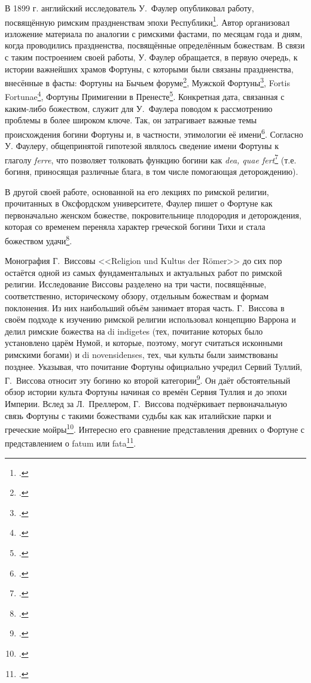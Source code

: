 
В 1899 г. английский исследователь У.~Фаулер опубликовал работу, посвящённую римским праздненствам эпохи Республики\footcite{Fowler1899}. Автор организовал изложение материала по аналогии с римскими фастами, по месяцам года и дням, когда проводились праздненства, посвящённые определённым божествам. В связи с таким построением своей работы, У. Фаулер обращается, в первую очередь, к истории важнейших храмов Фортуны, с которыми были связаны праздненства, внесённые в фасты: Фортуны на Бычьем форуме\footcite[P. 156--157]{Fowler1899}, Мужской Фортуны\footcite[P. 68]{Fowler1899}, Fortis Fortunae\footcite[P. 161--163]{Fowler1899}, Фортуны Примигении в Пренесте\footcite[P. 72, 165--168]{Fowler1899}. Конкретная дата, связанная с каким-либо божеством, служит для У.~Фаулера поводом к рассмотрению проблемы в более широком ключе. Так, он затрагивает важные темы происхождения богини Фортуны и, в частности, этимологии её имени\footcite[P. 163--171]{Fowler1899}. Согласно У. Фаулеру, общепринятой гипотезой являлось сведение имени Фортуны к глаголу \textit{ferre}, что позволяет толковать функцию богини как \textit{dea, quae fert}\footcite[P. 163--164]{Fowler1899} (т.е. богиня, приносящая различные блага, в том числе помогающая деторождению).

В другой своей работе, основанной на его лекциях по римской религии, прочитанных в Оксфордском университете, Фаулер пишет о Фортуне как первоначально женском божестве, покровительнице плодородия и деторождения, которая со временем переняла характер греческой богини Тихи и стала божеством удачи\footcite[P. 235]{Fowler1911}.


Монография Г.~Виссовы <<Religion und Kultus der R\"{o}mer>> до сих пор остаётся одной из самых фундаментальных и актуальных работ по римской религии. Исследование Виссовы разделено на три части, посвящённые, соответственно, историческому обзору, отдельным божествам и формам поклонения. Из них наибольший объём занимает вторая часть. Г.~Виссова в своём подходе к изучению римской религии использовал концепцию Варрона и делил римские божества на di indigetes (тех, почитание которых было установлено царём Нумой, и которые, поэтому, могут считаться исконными римскими богами) и di novensidenses, тех, чьи культы были заимствованы позднее. Указывая, что почитание Фортуны официально учредил Сервий Туллий, Г.~Виссова относит эту богиню ко второй категории\footcite[S. 206]{Wissowa1902}. Он даёт обстоятельный обзор истории культа Фортуны начиная со времён Сервия Туллия и до эпохи Империи. Вслед за Л.~Преллером, Г.~Виссова подчёркивает первоначальную связь Фортуны с такими божествами судьбы как как италийские парки и греческие мойры\footcite[S. 213]{Wissowa1902}. Интересно его сравнение представления древних о Фортуне с представлением о fatum или fata\footcite[S. 213--214]{Wissowa1902}.

